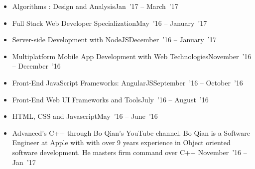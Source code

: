 \documentclass[10pt,a4paper]{article}
\begin{document}
\vspace{0.15cm}
\begin{itemize}[labelindent=1.5em,labelsep=-0.3cm,leftmargin=*]
\item \headedsubsection 
    {Algorithms : Design and Analysis}{{{Jan~'17 -- March~'17}}}
    {}
    
\item \headedsubsection 
    {Full Stack Web Developer Specialization}{{{May~'16 -- January~'17}}}
    {}
    
\item \headedsubsection 
    {Server-side Development with NodeJS}{{{December~'16 -- January~'17}}}
    {}

\item \headedsubsection 
    {Multiplatform Mobile App Development with Web Technologies}{{{November~'16 -- December~'16}}}
    {}
    
\item \headedsubsection 
    {Front-End JavaScript Frameworks: AngularJS}{{{September~'16 -- October~'16}}}
    {}
    
\item \headedsubsection 
    {Front-End Web UI Frameworks and Tools}{{{July~'16 -- August~'16}}}
    {}
    

\item \headedsubsection 
    {HTML, CSS and Javascript}{{{May~'16 -- June~'16}}}
    {}
    

\item \headedsubsection  %
  {{\normalfont Advanced's C++ through Bo Qian's YouTube channel. Bo Qian is a Software Engineer at Apple with with over 9 years experience in Object oriented software development. He masters firm command over C++ }}{{{November~'16 -- Jan~'17}}}
  
\end{itemize}
\end{document}
